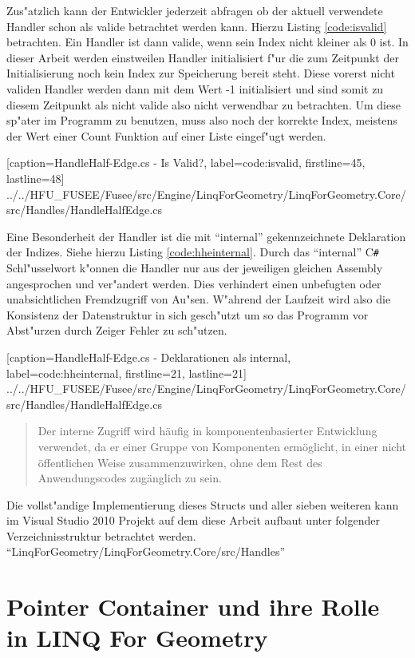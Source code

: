 \documentclass[12pt,a4paper]{scrreprt}
\newcommand{\CSS}{C\texttt{\# }}
\newcommand{\LFG}{LINQ For Geometry}
\begin{document}
Zus"atzlich kann der Entwickler jederzeit abfragen ob der aktuell verwendete Handler schon als valide betrachtet werden kann. Hierzu Listing \ref{code:isvalid} betrachten. Ein Handler ist dann valide, wenn sein Index nicht kleiner als 0 ist. In dieser Arbeit werden einstweilen Handler initialisiert f"ur die zum Zeitpunkt der Initialisierung noch kein Index zur Speicherung bereit steht. Diese vorerst nicht validen Handler werden dann mit dem Wert -1 initialisiert und sind somit zu diesem Zeitpunkt als nicht valide also nicht verwendbar zu betrachten. Um diese sp"ater im Programm zu benutzen, muss also noch der korrekte Index, meistens der Wert einer Count Funktion auf einer Liste eingef"ugt werden.

			[caption={HandleHalf-Edge.cs - Is Valid?}, label=code:isvalid, firstline=45, lastline=48]
			{../../HFU_FUSEE/Fusee/src/Engine/LinqForGeometry/LinqForGeometry.Core/src/Handles/HandleHalfEdge.cs}

Eine Besonderheit der Handler ist die mit "`internal"' gekennzeichnete Deklaration der Indizes. Siehe hierzu Listing \ref{code:hheinternal}. Durch das "`internal"' \CSS Schl"usselwort k"onnen die Handler nur aus der jeweiligen gleichen Assembly angesprochen und ver"andert werden. Dies verhindert einen unbefugten oder unabsichtlichen Fremdzugriff von Au"sen. W"ahrend der Laufzeit wird also die Konsistenz der Datenstruktur in sich gesch"utzt um so das Programm vor Abst"urzen durch Zeiger Fehler zu sch"utzen.

			[caption={HandleHalf-Edge.cs - Deklarationen als internal}, label=code:hheinternal, firstline=21, lastline=21]
			{../../HFU_FUSEE/Fusee/src/Engine/LinqForGeometry/LinqForGeometry.Core/src/Handles/HandleHalfEdge.cs}

\begin{quote}{\dq}Der interne Zugriff wird h{\"a}ufig in komponentenbasierter Entwicklung verwendet, da er einer Gruppe von Komponenten erm{\"o}glicht, in einer nicht {\"o}ffentlichen Weise zusammenzuwirken, ohne dem Rest des Anwendungscodes zug{\"a}nglich zu sein.{\dq} \cite{MicrosoftCReferenz.2013}\end{quote}


Die vollst"andige Implementierung dieses Structs und aller sieben weiteren kann im Visual Studio 2010 Projekt auf dem diese Arbeit aufbaut unter folgender Verzeichnisstruktur betrachtet werden. "`LinqForGeometry/LinqForGeometry.Core/src/Handles"'

\section {Pointer Container und ihre Rolle in \LFG}
\end{document}
